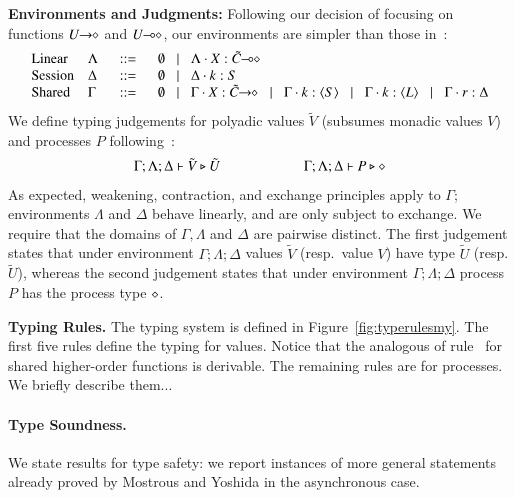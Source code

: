 {\bf Environments and Judgments:}
Following our decision of focusing on functions
$U\!\! \rightarrow\!\! \diamond$ and $U\!\! \multimap\!\! \diamond$, our environments are
simpler than those in~\cite{tlca07}:
%
\[
\begin{array}{llcl}
	\text{Linear} & \Lambda & \bnfis & \emptyset \bnfbar \Lambda \cat \varp{X}: \lhot{\tilde{C}}\\
	\text{Session} & \Delta & \bnfis & \emptyset \bnfbar \Delta \cat k:S \\
	\text{Shared} & \Gamma & \bnfis & \emptyset \bnfbar \Gamma \cat \varp{X}: \shot{\tilde{C}} \bnfbar \Gamma \cat k: \chtype{S} \bnfbar \Gamma \cat k: \chtype{L} \bnfbar \Gamma \cat r: \Delta
\end{array}
\]
%
\noi We define typing judgements for polyadic values $\tilde{V}$
(subsumes monadic values $V$)
and processes $P$ following~\cite{tlca07}:
%
\[	\begin{array}{c}
		\Gamma; \Lambda; \Delta \vdash \tilde{V} \triangleright \tilde{U} \qquad \qquad \qquad \Gamma; \Lambda; \Delta \vdash P \triangleright \diamond
	\end{array}
\]
%
\noi As expected, weakening, contraction, and exchange principles apply to $\Gamma$;
environments $\Lambda$ and $\Delta$ behave linearly, and are only subject to exchange.
We require that the domains of $\Gamma, \Lambda$ and $\Delta$ are pairwise distinct.
The first judgement states that under environment $\Gamma; \Lambda; \Delta$
values $\tilde{V}$ (resp.\ value $V$) have type $\tilde{U}$
(resp. $\tilde{U}$),
whereas the second judgement states that under environment $\Gamma; \Lambda; \Delta$
process $P$ has the process type $\diamond$.

{\bf Typing Rules.}
The typing system is defined in Figure~\ref{fig:typerulesmy}. 
The first five rules define the typing for values. Notice that the analogous of rule~
for shared higher-order functions is derivable.
The remaining rules are for processes. We briefly describe them...



\paragraph{Type Soundness.}
We state results for type safety:
we report instances of more general statements already proved by
Mostrous and Yoshida in the asynchronous case.

